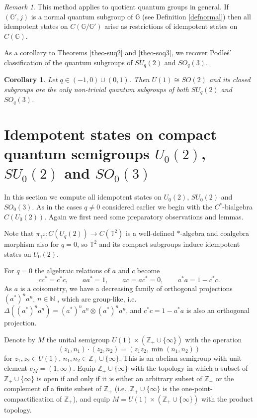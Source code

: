 \documentclass[12pt]{amsart}
\newtheorem{corollary}[theorem]{Corollary}
\theoremstyle{definition}
\theoremstyle{remark}
\newtheorem{remark}[theorem]{Remark}
\numberwithin{equation}{section}
\begin{document}
\begin{remark}
This method applies to quotient quantum groups in general. If $({\mathbb{G}}', j)$ is a normal quantum subgroup of ${\mathbb{G}}$ (see Definition \ref{defnormal}) then all idempotent states on $C({\mathbb{G}}/{\mathbb{G}}')$ arise as restrictions of
idempotent states on $C({\mathbb{G}})$.
\end{remark}

As a corollary to Theorems \ref{theo-suq2} and  \ref{theo-soq3}, we recover Podle\'s' classification \cite{podles95} of the quantum subgroups of $SU_q(2)$ and $SO_q(3)$.
\begin{corollary}
Let $q\in(-1,0)\cup(0,1)$. Then $U(1)\cong SO(2)$ and its closed subgroups are the
only non-trivial quantum subgroups of both $SU_q(2)$ and $SO_q(3)$.
\end{corollary}

\section{Idempotent states on compact quantum semigroups $U_0(2)$, $SU_0(2)$ and $SO_0(3)$}

In this section we compute all idempotent states on $U_0(2)$, $SU_0(2)$ and $SO_0(3)$.
As in the cases $q\neq 0$ considered earlier we begin with the  $C^*$-bialgebra $C(U_0(2))$. Again we first need  some preparatory observations and lemmas.

Note that $\pi_{\mathbb{T}^2}:C(U_q(2))\to C(\mathbb{T}^2)$ is a well-defined
$*$-algebra and coalgebra morphism also for $q=0$, so $\mathbb{T}^2$ and its
compact subgroups induce idempotent states on $U_0(2)$.

For $q=0$ the algebraic relations of $a$ and $c$ become
\[
cc^*=c^*c,\qquad aa^*=1,\qquad ac=ac^*=0,\qquad a^*a=1-c^*c.
\]
As $a$ is a coisometry, we have a decreasing family of orthogonal projections $(a^*)^na^n$,
$n\in\mathbb{N}$ , which are group-like, i.e.\ $\Delta ((a^*)^na^n) = (a^*)^na^n\otimes
(a^*)^na^n$, and $c^*c=1-a^*a$ is also an orthogonal projection.

Denote by $M$ the unital semigroup $U(1)\times(\mathbb{Z}_+\cup\{\infty\})$
with the operation
\[
(z_1,n_1)\cdot (z_2,n_2) = (z_1z_2,\min(n_1,n_2))
\]
for $z_1,z_2\in U(1)$, $n_1,n_2\in \mathbb{Z}_+\cup\{\infty\}$. This is an abelian semigroup with unit element 
$e_M=(1,\infty)$. Equip $\mathbb{Z}_+\cup\{\infty\}$ with the topology in which a subset of 
$\mathbb{Z}_+\cup\{\infty\}$ is open if and only if it is either an arbitrary subset of $\mathbb{Z}_+$ or the 
complement of a finite subset of $\mathbb{Z}_+$ (i.e.\ $\mathbb{Z}_+\cup\{\infty\}$ is the 
one-point-compactification of $\mathbb{Z}_+$), and equip $M=U(1)\times(\mathbb{Z}_+\cup\{\infty\})$ with the 
product topology.
\end{document}
